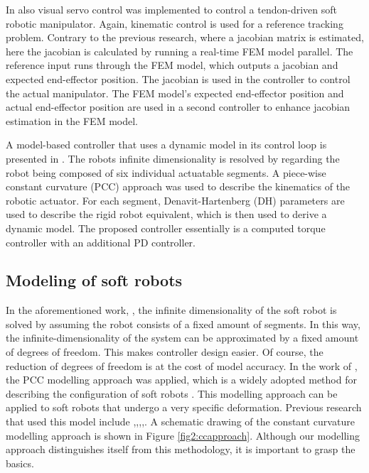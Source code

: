 In \cite{zhang2017visual} also visual servo control was implemented to control a tendon-driven soft robotic manipulator. Again, kinematic control is used for a reference tracking problem. Contrary to the previous research, where a jacobian matrix is estimated, here the jacobian is calculated by running a real-time FEM model parallel. The reference input runs through the FEM model, which outputs a jacobian and expected end-effector position. The jacobian is used in the controller to control the actual manipulator. The FEM model's expected end-effector position and actual end-effector position are used in a second controller to enhance jacobian estimation in the FEM model.

A model-based controller that uses a dynamic model in its control loop is presented in \cite{della2020model}. The robots infinite dimensionality is resolved by regarding the robot being composed of six individual actuatable segments. A piece-wise constant curvature (PCC) approach was used to describe the kinematics of the robotic actuator. For each segment, Denavit-Hartenberg (DH) parameters are used to describe the rigid robot equivalent, which is then used to derive a dynamic model. The proposed controller essentially is a computed torque controller with an additional PD controller. 

\subsection*{Modeling of soft robots}

In the aforementioned work, \cite{della2020model}, the infinite dimensionality of the soft robot is solved by assuming the robot consists of a fixed amount of segments. In this way, the infinite-dimensionality of the system can be approximated by a fixed amount of degrees of freedom. This makes controller design easier. Of course, the reduction of degrees of freedom is at the cost of model accuracy. In the work of \cite{della2020model}, the PCC modelling approach was applied, which is a widely adopted method for describing the configuration of soft robots \cite{ccapproach}. This modelling approach can be applied to soft robots that undergo a very specific deformation. Previous research that used this model include \cite{mahl2014bhakin},\cite{ccapproach},\cite{berkers},\cite{Falkenhahn2015},\cite{runge2017framework}. A schematic drawing of the constant curvature modelling approach is shown in Figure \ref{fig2:ccapproach}. Although our modelling approach distinguishes itself from this methodology, it is important to grasp the basics. 

